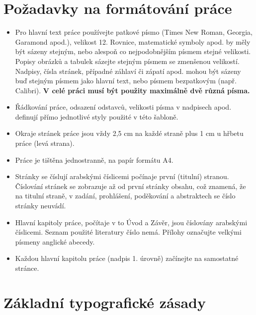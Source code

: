 \chapter{Požadavky na formátování práce}
\label{app:pozadavky}

\begin{itemize}
    \item Pro hlavní text práce používejte patkové písmo (Times New Roman, Georgia, Garamond apod.), velikost 12. Rovnice, matematické symboly apod. by měly být sázeny stejným, nebo alespoň co nejpodobnějším písmem stejné velikosti. Popisy obrázků a tabulek sázejte stejným písmem se zmenšenou velikostí. Nadpisy, čísla stránek, případné záhlaví či zápatí apod. mohou být sázeny buď stejným písmem jako hlavní text, nebo písmem bezpatkovým (např. Calibri). \textbf{V celé práci musí být použity maximálně dvě různá písma.}
    \item Řádkování práce, odsazení odstavců, velikosti písma v nadpisech apod. definují přímo jednotlivé styly použité v této šabloně.
    \item Okraje stránek práce jsou vždy 2,5 cm na každé straně plus 1 cm u hřbetu práce (levá strana).
    \item Práce je tištěna jednostranně, na papír formátu A4.
    \item Stránky se číslují arabskými číslicemi počínaje první (titulní) stranou. Číslování stránek se zobrazuje až od první stránky obsahu, což znamená, že na titulní straně, v zadání, prohlášení, poděkování a abstraktech se číslo stránky neuvádí.
    \item Hlavní kapitoly práce, počítaje v to Úvod a Závěr, jsou číslovány arabskými číslicemi. Seznam použité literatury číslo nemá. Přílohy označujte velkými písmeny anglické abecedy.
    \item Každou hlavní kapitolu práce (nadpis 1. úrovně) začínejte na samostatné stránce.
\end{itemize}
\clearpage

\chapter{Základní typografické zásady}
\label{app:typo}
    
